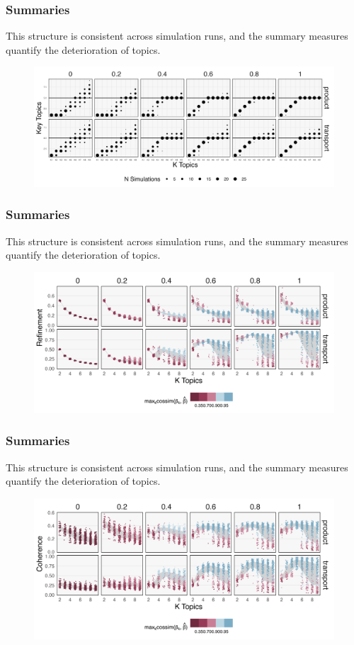 \documentclass[hyperref={colorlinks=true, linkcolor=violet, citecolor=SeaGreen}]{beamer}
\begin{document}
\begin{frame}
  \frametitle{Summaries}
  This structure is consistent across simulation runs, and the summary measures
  quantify the deterioration of topics.
\begin{figure}
    \includegraphics[width=\textwidth]{gradient_key_topics}
\end{figure}
\end{frame}

\begin{frame}
  \frametitle{Summaries}
  This structure is consistent across simulation runs, and the summary measures
  quantify the deterioration of topics.
\begin{figure}
    \includegraphics[width=\textwidth]{gradient_refinement_full}
\end{figure}
\end{frame}

\begin{frame}
  \frametitle{Summaries}
  This structure is consistent across simulation runs, and the summary measures
  quantify the deterioration of topics.
\begin{figure}
    \includegraphics[width=\textwidth]{gradient_stability}
\end{figure}
\end{frame}
\end{document}
